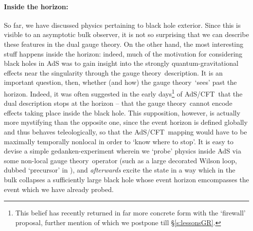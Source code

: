 \documentclass[12pt]{article}
\def\sect#1{\S\ref{#1}}
\def\AC{AdS/CFT}
\def\GT{gauge theory}
\begin{document}
\paragraph{Inside the horizon:}  %
So far, we have discussed physics pertaining to black hole exterior.  Since this is visible to an asymptotic bulk observer, it is not so surprising that we can describe these features in the dual \GT.
On the other hand, the most interesting stuff happens inside the horizon:  indeed, much of the motivation for considering black holes in AdS was to gain insight into the strongly quantum-gravitational effects near the singularity through the \GT\ description.  It is an important question, then, whether (and how) the \GT\ `sees' past the horizon.  Indeed, it was often suggested in the early days\footnote{
This belief has recently returned in far more concrete form with the `firewall' proposal, further mention of which we postpone till \sect{s:lessonsGR}.
} of \AC\ that the dual description stops at the horizon -- that the \GT\ cannot encode effects taking place inside the black hole.  This supposition, however, is actually more mystifying than the opposite one, since the event horizon is defined globally and thus behaves teleologically, so that the \AC\ mapping would have to be maximally temporally nonlocal in order to `know where to stop'.  It is easy to devise a simple gedanken-experiment  \cite{Hubeny:2002dg} wherein we `probe' physics inside AdS via some non-local \GT\ operator (such as a large decorated Wilson loop,  dubbed `precursor' in \cite{Polchinski:1999yd}), and {\it afterwards} excite the state in a way which in the bulk  collapses a sufficiently large black hole whose event horizon emcompasses the event which we have already probed.
\end{document}
